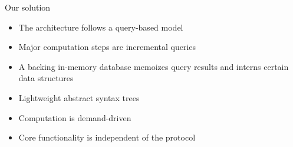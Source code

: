 \documentclass[aspectratio=169]{beamer}
\begin{document}
\begin{frame}{Our solution}
	\begin{itemize}
		\item The architecture follows a \alert{query-based model} \pause
		\item Major computation steps are \alert{incremental queries} \pause
		\item A backing in-memory database memoizes query results and interns
		certain data structures \pause
		\item Lightweight abstract syntax trees \pause
		\item Computation is \alert{demand-driven} \pause
		\item Core functionality is independent of the protocol
	\end{itemize}
\end{frame}
\end{document}
